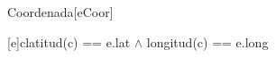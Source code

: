 \begin{Representacion}


	\begin{Estructura}{Coordenada}[eCoor]
		\begin{Tupla}[eCoor]
		\end{Tupla}

	\end{Estructura}





	{c}{latitud(c) == e.lat $\land$ longitud(c) == e.long}

\end{Representacion}


